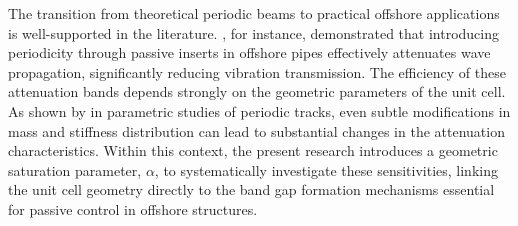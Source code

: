
The transition from theoretical periodic beams to practical offshore applications is well-supported in the literature. \textcite{Asiri2014}, for instance, demonstrated that introducing periodicity through passive inserts in offshore pipes effectively attenuates wave propagation, significantly reducing vibration transmission. The efficiency of these attenuation bands depends strongly on the geometric parameters of the unit cell. As shown by \textcite{Iqbal2023} in parametric studies of periodic tracks, even subtle modifications in mass and stiffness distribution can lead to substantial changes in the attenuation characteristics. Within this context, the present research introduces a geometric saturation parameter, $\alpha$, to systematically investigate these sensitivities, linking the unit cell geometry directly to the band gap formation mechanisms essential for passive control in offshore structures.



